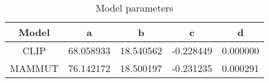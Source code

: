 \begin{table}
\centering
\begin{tabular}{|c||c|c|c|c|}
\hline
\textbf{Model} & \textbf{a} & \textbf{b} & \textbf{c} & \textbf{d} \\
\hline
CLIP & 68.058933 & 18.540562 & -0.228449 & 0.000000 \\
\hline
MAMMUT & 76.142172 & 18.500197 & -0.231235 & 0.000291 \\
\hline
\end{tabular}
\caption{Model parameters}
\label{tab:coefficients}
\end{table}
